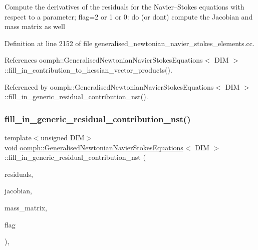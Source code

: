 Compute the derivatives of the residuals for the Navier--Stokes equations with respect to a parameter; flag=2 or 1 or 0\+: do (or don\textquotesingle{}t) compute the Jacobian and mass matrix as well 

Definition at line 2152 of file generalised\+\_\+newtonian\+\_\+navier\+\_\+stokes\+\_\+elements.\+cc.



References oomph\+::\+Generalised\+Newtonian\+Navier\+Stokes\+Equations$<$ D\+I\+M $>$\+::fill\+\_\+in\+\_\+contribution\+\_\+to\+\_\+hessian\+\_\+vector\+\_\+products().



Referenced by oomph\+::\+Generalised\+Newtonian\+Navier\+Stokes\+Equations$<$ D\+I\+M $>$\+::fill\+\_\+in\+\_\+generic\+\_\+residual\+\_\+contribution\+\_\+nst().

\mbox{\label{classoomph_1_1GeneralisedNewtonianNavierStokesEquations_a1f89df32ac0963374166d401a7de7b8f}} 
\subsubsection{\texorpdfstring{fill\+\_\+in\+\_\+generic\+\_\+residual\+\_\+contribution\+\_\+nst()}{fill\_in\_generic\_residual\_contribution\_nst()}}
{\footnotesize\ttfamily template$<$unsigned D\+IM$>$ \\
void \hyperlink{classoomph_1_1GeneralisedNewtonianNavierStokesEquations}{oomph\+::\+Generalised\+Newtonian\+Navier\+Stokes\+Equations}$<$ D\+IM $>$\+::fill\+\_\+in\+\_\+generic\+\_\+residual\+\_\+contribution\+\_\+nst (\begin{DoxyParamCaption}\item[{\hyperlink{classoomph_1_1Vector}{Vector}$<$ double $>$ \&}]{residuals,  }\item[{\hyperlink{classoomph_1_1DenseMatrix}{Dense\+Matrix}$<$ double $>$ \&}]{jacobian,  }\item[{\hyperlink{classoomph_1_1DenseMatrix}{Dense\+Matrix}$<$ double $>$ \&}]{mass\+\_\+matrix,  }\item[{unsigned}]{flag }\end{DoxyParamCaption})\hspace{0.3cm}{\ttfamily [protected]}, {\ttfamily [virtual]}}



